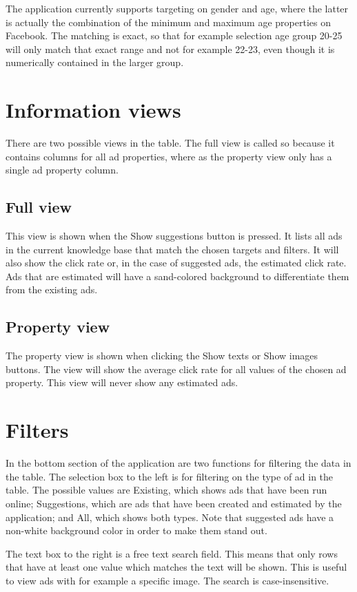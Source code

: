 \documentclass[11pt,twoside,a4paper]{article}
\begin{document}
The application currently supports targeting on gender and age, where the latter is actually the combination of the minimum and maximum age properties on Facebook. The matching is exact, so that for example selection age group 20-25 will only match that exact range and not for example 22-23, even though it is numerically contained in the larger group.

\section{Information views}
There are two possible views in the table. The full view is called so because it contains columns for all ad properties, where as the property view only has a single ad property column.

\subsection{Full view}
This view is shown when the Show suggestions button is pressed. It lists all ads in the current knowledge base that match the chosen targets and filters. It will also show the click rate or, in the case of suggested ads, the estimated click rate. Ads that are estimated will have a sand-colored background to differentiate them from the existing ads.

\subsection{Property view}
The property view is shown when clicking the Show texts or Show images buttons. The view will show the average click rate for all values of the chosen ad property. This view will never show any estimated ads.

\section{Filters}
In the bottom section of the application are two functions for filtering the data in the table. The selection box to the left is for filtering on the type of ad in the table. The possible values are Existing, which shows ads that have been run online; Suggestions, which are ads that have been created and estimated by the application; and All, which shows both types. Note that suggested ads have a non-white background color in order to make them stand out.

The text box to the right is a free text search field. This means that only rows that have at least one value which matches the text will be shown. This is useful to view ads with for example a specific image. The search is case-insensitive.
\end{document}

